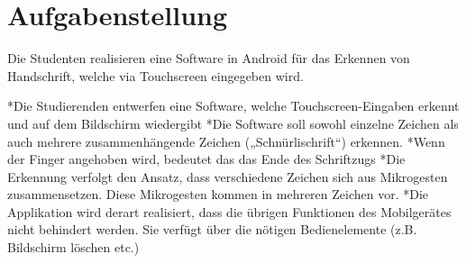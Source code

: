 \chapter{Aufgabenstellung}
Die Studenten realisieren eine Software in Android für das Erkennen von Handschrift, welche via Touchscreen eingegeben wird.

*Die Studierenden entwerfen eine Software, welche Touchscreen-Eingaben erkennt und auf dem Bildschirm wiedergibt
*Die Software soll sowohl einzelne Zeichen als auch mehrere zusammenhängende Zeichen („Schnürlischrift“) erkennen.
*Wenn der Finger angehoben wird, bedeutet das das Ende des Schriftzugs
*Die Erkennung verfolgt den Ansatz, dass verschiedene Zeichen sich aus Mikrogesten zusammensetzen. Diese Mikrogesten kommen in mehreren Zeichen vor.
*Die Applikation wird derart realisiert, dass die übrigen Funktionen des Mobilgerätes nicht behindert werden. Sie verfügt über die nötigen Bedienelemente (z.B. Bildschirm löschen etc.)